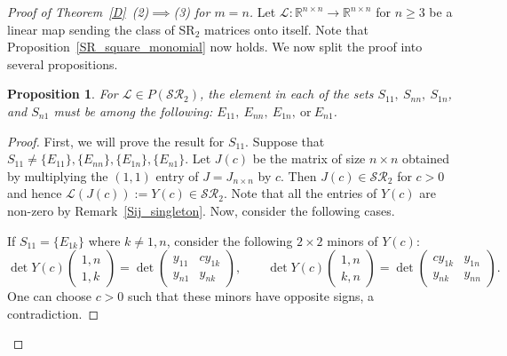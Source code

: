 \documentclass[11pt,reqno]{amsart}
\theoremstyle{plain}
\newtheorem{prop}[theorem]{Proposition}
\theoremstyle{definition}
\numberwithin{equation}{section}
\begin{document}
\begin{proof}[Proof of Theorem~\ref{D}~(2)$\implies$(3) for $m=n$]
	Let $\mathcal{L}:\mathbb{R}^{n\times n}\to\mathbb{R}^{n\times n}$ for $n\geq3$ be a linear  map sending the class of SR$_2$ matrices onto itself. Note that Proposition~\ref{SR_square_monomial} now holds. We now split the proof into several propositions.
	
	\begin{prop}\label{SR_square_S11SnnS1nSn1_elements}
		For $\mathcal{L}\in P(\mathcal{SR}_2)$, the element in each of the sets $S_{11},\ S_{nn},\ S_{1n}$, and $S_{n1}$ must be among the following: $E_{11},\ E_{nn},\ E_{1n},\ \text{or}\ E_{n1}$.
	\end{prop}
	
	\begin{proof}
		First, we will prove the result for $S_{11}$. Suppose that $S_{11}\neq\{E_{11}\}, \{E_{nn}\}, \{E_{1n}\}, \{E_{n1}\}$. Let $J(c)$ be the matrix of size $n\times n$ obtained by multiplying the $(1,1)$ entry of $J=J_{n\times n}$ by $c$. Then $J(c)\in \mathcal{SR}_2$ for $c>0$ and hence $\mathcal{L}(J(c)):=Y(c)\in \mathcal{SR}_2$. Note that all the entries of $Y(c)$ are non-zero by Remark~\ref{Sij_singleton}. Now, consider the following cases.
		
		If $S_{11}=\{E_{1k}\}$ where $k\neq1,n$, consider the following $2 \times 2$ minors of $Y(c)$:
		\[ \det Y(c) \begin{pmatrix} 1,n \\ 1,k \end{pmatrix}
		= \det\begin{pmatrix}
			y_{11} & cy_{1k} \\
			y_{n1} & y_{nk}
		\end{pmatrix}, \qquad
		\det Y(c) \begin{pmatrix} 1,n \\ k,n \end{pmatrix}
		= \det\begin{pmatrix}
			cy_{1k} & y_{1n} \\
			y_{nk} & y_{nn}
		\end{pmatrix}. \]
		One can choose $c>0$ such that these minors have opposite signs, a contradiction. 
		

\end{proof}
\end{proof}
\end{document}
